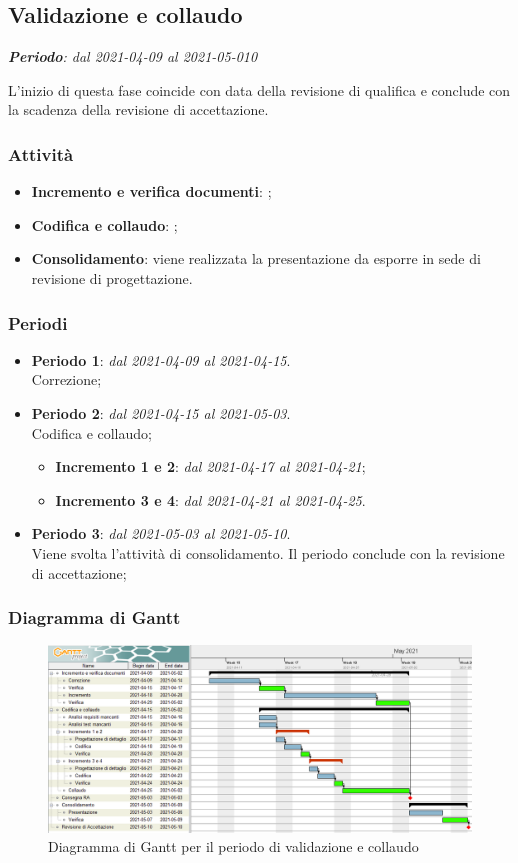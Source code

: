 \subsection{Validazione e collaudo}
\textit{\textbf{Periodo}: dal 2021-04-09 al 2021-05-010}

L'inizio di questa fase coincide con data della revisione di qualifica e conclude con la scadenza della revisione di accettazione.

\subsubsection{Attività}

\begin{itemize}
\item \textbf{Incremento e verifica documenti}: ;
\item \textbf{Codifica e collaudo}: ;
\item \textbf{Consolidamento}: viene realizzata la presentazione da esporre in sede di revisione di progettazione.
\end{itemize}

\subsubsection{Periodi}

\begin{itemize}
\item \textbf{Periodo 1}: \textit{dal 2021-04-09 al 2021-04-15}. \\
Correzione;
\item \textbf{Periodo 2}: \textit{dal 2021-04-15 al 2021-05-03}. \\
Codifica e collaudo;
\begin{itemize}
\item \textbf{Incremento 1 e 2}: \textit{dal 2021-04-17 al 2021-04-21};
\item \textbf{Incremento 3 e 4}: \textit{dal 2021-04-21 al 2021-04-25}.
\end{itemize}
\item \textbf{Periodo 3}: \textit{dal 2021-05-03 al 2021-05-10}. \\
Viene svolta l'attività di consolidamento. Il periodo conclude con la revisione di accettazione;
\end{itemize}

\subsubsection{Diagramma di Gantt}

\begin{figure}[H]
\centering

\centerline{\includegraphics[scale=0.6]{res/Pianificazione/Gantt/verifica}}
\caption{Diagramma di Gantt per il periodo di validazione e collaudo}
\end{figure}
